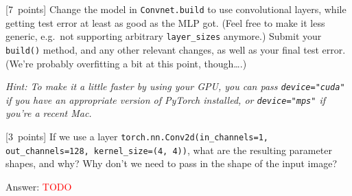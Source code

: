 \documentclass{article}
\newcommand{\ask}[1]{\textcolor{question}{#1}}
\newenvironment{answer}{\par\begingroup\color{answer}Answer: }{\endgroup}
\newcommand{\red}[1]{\textcolor{red}{#1}}
\newcommand{\pts}[1]{\textcolor{points}{[#1~points]}}
\newcommand{\hint}[1]{\textcolor{black!60!white}{\emph{Hint: #1}}}
\newcommand{\TODO}{\red{TODO}}
\begin{document}
\begin{qlist}[resume]
\item \pts{7} Change the model in \texttt{Convnet.build} to use convolutional layers, while getting test error at least as good as the MLP got. (Feel free to make it less generic, e.g.\ not supporting arbitrary \texttt{layer\_sizes} anymore.) \ask{Submit your \texttt{build()} method, and any other relevant changes, as well as your final test error.} (We're probably overfitting a bit at this point, though\dots.)

\hint{To make it a little faster by using your GPU, you can pass \texttt{device="cuda"} if you have an appropriate version of PyTorch installed, or \texttt{device="mps"} if you're a recent Mac.}

\item \pts{3} If we use a layer \texttt{torch.nn.Conv2d(in\_channels=1, out\_channels=128, kernel\_size=(4, 4))}, \ask{what are the resulting parameter shapes, and why? Why don't we need to pass in the shape of the input image?}
\begin{answer}\TODO\end{answer}

\end{qlist}
\end{document}

